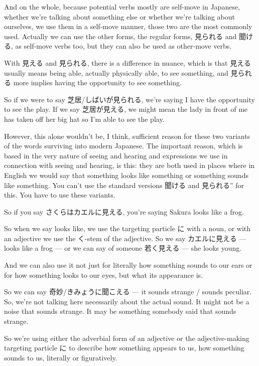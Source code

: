 And on the whole, because potential verbs mostly are self-move in Japanese, whether we're talking about something else or whether we're talking about ourselves, we use them in a self-move manner, those two are the most commonly used. Actually we can use the other forms, the regular forms, 見られる and 聞ける, as self-move verbs too, but they can also be used as other-move verbs.

\thinrule

With 見える and 見られる, there is a difference in nuance, which is that 見える usually means being able, actually physically able, to see something, and 見られる more implies having the opportunity to see something.

So if we were to say 芝居/しばいが見られる, we're saying I have the opportunity to see the play. If we say 芝居が見える, we might mean the lady in front of me has taken off her big hat so I'm able to see the play.

However, this alone wouldn't be, I think, sufficient reason for these two variants of the words surviving into modern Japanese. The important reason, which is based in the very nature of seeing and hearing and expressions we use in connection with seeing and hearing, is this: they are both used in places where in English we would say that something looks like something or something sounds like something. You can't use the standard versions 聞ける and 見られる” for this. You have to use these variants.

So if you say さくらはカエルに見える, you're saying Sakura looks like a frog.

So when we say looks like, we use the targeting particle に with a noun, or with an adjective we use the く-stem of the adjective. So we say カエルに見える --- looks like a frog --- or we can say of someone 若く見える --- she looks young.

\thinrule

And we can also use it not just for literally how something sounds to our ears or for how something looks to our eyes, but what its appearance is.

So we can say 奇妙/きみょうに聞こえる --- it sounds strange / sounds peculiar. So, we're not talking here necessarily about the actual sound. It might not be a noise that sounds strange. It may be something somebody said that sounds strange.

\thinrule

So we're using either the adverbial form of an adjective or the adjective-making targeting particle に to describe how something appears to us, how something sounds to us, literally or figuratively.

